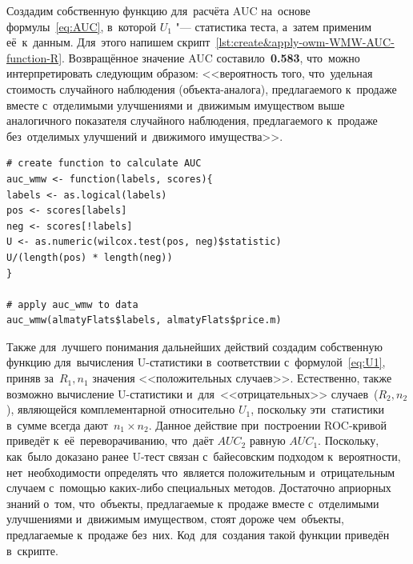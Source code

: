 \documentclass[]{scrreprt}
\begin{document}
Создадим собственную функцию для~расчёта AUC на~основе формулы~\ref{eq:AUC}, в~которой $U_{1}$ "--- статистика теста, а~затем применим её~к~данным. Для~этого напишем скрипт~\ref{lst:create&apply-owm-WMW-AUC-function-R}. Возвращённое значение AUC составило~\textbf{0.583}, что~можно интерпретировать следующим образом: <<вероятность того, что~удельная стоимость случайного наблюдения (объекта-аналога), предлагаемого к~продаже вместе с~отделимыми улучшениями и~движимым имуществом выше аналогичного показателя случайного наблюдения, предлагаемого к~продаже без~отделимых улучшений и~движимого имущества>>.
%
\begin{lstlisting}[float, caption = Создание собственной функции для~расчёта AUC и~её~применение к~данным рынка Алматы, firstnumber=1, label= lst:create&apply-owm-WMW-AUC-function-R]
# create function to calculate AUC
auc_wmw <- function(labels, scores){
labels <- as.logical(labels)
pos <- scores[labels]
neg <- scores[!labels]
U <- as.numeric(wilcox.test(pos, neg)$statistic)
U/(length(pos) * length(neg))
}

# apply auc_wmw to data
auc_wmw(almatyFlats$labels, almatyFlats$price.m)
\end{lstlisting}
%

Также для~лучшего понимания дальнейших действий создадим собственную функцию для~вычисления U-статистики в~соответствии с~формулой~\ref{eq:U1}, приняв за~$R_{1}, n_{1}$ значения <<положительных случаев>>. Естественно, также возможно вычисление U-статистики и~для~<<отрицательных>> случаев~($R_{2}, n_{2}$), являющейся комплементарной относительно $U_{1}$, поскольку эти~статистики в~сумме всегда дают~$n_{1} \times n_{2}$. Данное действие при~построении ROC-кривой приведёт к~её~переворачиванию, что~даёт $AUC_{2}$ равную $AUC_{1}$. Поскольку, как~было доказано ранее U-тест связан с~байесовским подходом к~вероятности, нет~необходимости определять что~является положительным и~отрицательным случаем с~помощью каких-либо специальных методов. Достаточно априорных знаний о~том, что~объекты, предлагаемые к~продаже вместе с~отделимыми улучшениями и~движимым имуществом, стоят дороже чем~объекты, предлагаемые к~продаже без~них. Код~для~создания такой функции приведён в~скрипте.

\clearpage
\end{document}
